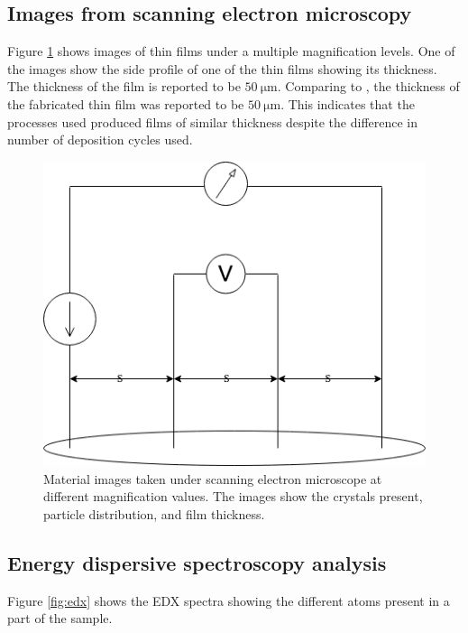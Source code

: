 \subsection{Images from scanning electron microscopy}

Figure \ref{fig:sem} shows images of thin films under a multiple magnification levels.
One of the images show the side profile of one of the thin films showing its thickness.
The thickness of the film is reported to be $\SI{50}{\micro\meter}$.
Comparing to , the thickness of the fabricated thin film was reported to be $\SI{50}{\micro\meter}$.
This indicates that the processes used produced films of similar thickness despite the difference in number of deposition cycles used.

\begin{figure}
  \centering
  \includegraphics[scale=0.4]{FourPoint.png}
  \caption[Material images under SEM]{Material images taken under scanning electron microscope at different magnification values. The images show the crystals present, particle distribution, and film thickness.}
  \label{fig:sem}
\end{figure}

\subsection{Energy dispersive spectroscopy analysis}

Figure \ref{fig:edx} shows the EDX spectra showing the different atoms present in a part of the sample.

